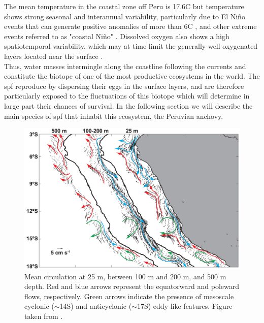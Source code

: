 The mean temperature in the coastal zone off Peru is 17.6\textdegree C \citep{Mont2003} but temperature shows strong seasonal and interannual variability, particularly due to El Niño events that can generate positive anomalies of more than 6\textdegree C  \citep{Sanc2000,Cai2014,Cai2017,Cai2018,Freu2019}, and other extreme events referred to as "coastal Niño" \citep{Eche2018,Garr2018,Hu2019,Rodr2019,TakaMart2019}. Dissolved oxygen also shows a high spatiotemporal variability, which may at time limit the generally well oxygenated layers located near the surface \citep{EspiEche2017,EspiEche2019}.\\

Thus, water masses intermingle along the coastline following the currents and constitute the biotope of one of the most productive ecosystems in the world. The \acrfull{spf} reproduce by dispersing their eggs in the surface layers, and are therefore particularly exposed to the fluctuations of this biotope which will determine in large part their chances of survival. In the following section we will describe the main species of \acrshort{spf} that inhabit this ecosystem, the Peruvian anchovy.\\

\begin{figure}[ht]
	\includegraphics[width=1.0\textwidth]{figures/Chap1MeanCirculationNHCS.png}
	\centering
	\caption{Mean circulation at 25 m, between 100 m and 200 m, and 500 m depth. Red and blue arrows represent the equatorward and poleward flows, respectively. Green arrows indicate the presence of mesoscale cyclonic ($\sim$14\textdegree S) and anticyclonic ($\sim$17\textdegree S) eddy-like features. Figure taken from \cite{ChaiDomi2013}.}
	\label{Chap1MeanCirculationNHCS}
\end{figure}

